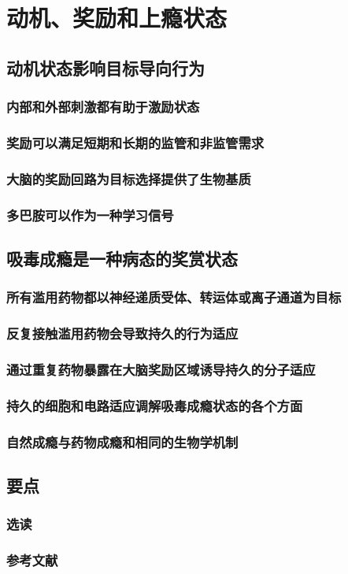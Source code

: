 \chapter{动机、奖励和上瘾状态}

\section{动机状态影响目标导向行为}
\subsection{内部和外部刺激都有助于激励状态}
\subsection{奖励可以满足短期和长期的监管和非监管需求}
\subsection{大脑的奖励回路为目标选择提供了生物基质}
\subsection{多巴胺可以作为一种学习信号}

\section{吸毒成瘾是一种病态的奖赏状态}
\subsection{所有滥用药物都以神经递质受体、转运体或离子通道为目标}
\subsection{反复接触滥用药物会导致持久的行为适应}
\subsection{通过重复药物暴露在大脑奖励区域诱导持久的分子适应}
\subsection{持久的细胞和电路适应调解吸毒成瘾状态的各个方面}
\subsection{自然成瘾与药物成瘾和相同的生物学机制}

\section{要点}
\subsection{选读}
\subsection{参考文献}